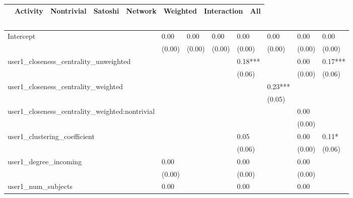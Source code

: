 \begin{table}
\caption{}
\begin{center}
\begin{tabular}{lccccccc}
\hline
                                               & Activity & Nontrivial & Satoshi & Network & Weighted & Interaction &   All    \\
\hline
\hline
\end{tabular}
\begin{tabular}{llllllll}
Intercept                                      & 0.00     & 0.00       & 0.00    & 0.00    & 0.00     & 0.00        & 0.00     \\
                                               & (0.00)   & (0.00)     & (0.00)  & (0.00)  & (0.00)   & (0.00)      & (0.00)   \\
user1_closeness_centrality_unweighted          &          &            &         & 0.18*** &          & 0.00        & 0.17***  \\
                                               &          &            &         & (0.06)  &          & (0.00)      & (0.06)   \\
user1_closeness_centrality_weighted            &          &            &         &         & 0.23***  &             &          \\
                                               &          &            &         &         & (0.05)   &             &          \\
user1_closeness_centrality_weighted:nontrivial &          &            &         &         &          & 0.00        &          \\
                                               &          &            &         &         &          & (0.00)      &          \\
user1_clustering_coefficient                   &          &            &         & 0.05    &          & 0.00        & 0.11*    \\
                                               &          &            &         & (0.06)  &          & (0.00)      & (0.06)   \\
user1_degree_incoming                          & 0.00     &            &         & 0.00    &          & 0.00        &          \\
                                               & (0.00)   &            &         & (0.00)  &          & (0.00)      &          \\
user1_num_subjects                             & 0.00     &            &         & 0.00    &          & 0.00        &          \\

\end{tabular}
\end{center}
\end{table}
